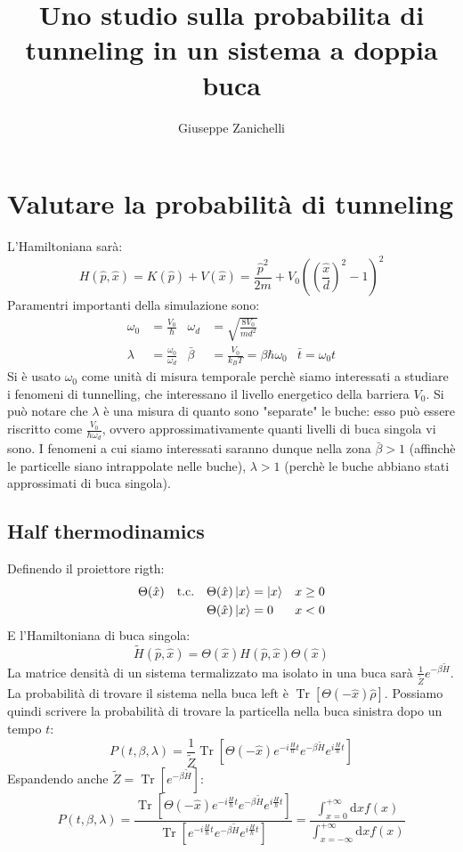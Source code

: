 \documentclass[italian]{article}
\title{Uno studio sulla probabilita di tunneling in un sistema a doppia buca}
\author{Giuseppe Zanichelli}
\newcommand{\op}{\hat{p}}
\newcommand{\ox}{\hat{x}}
\newcommand{\tc}{\quad\mathrm{t.c.}\quad}
\DeclareMathOperator{\Tr}{Tr}
\begin{document}
	\section{Valutare la probabilità di tunneling}
	L'Hamiltoniana sarà:
	\begin{equation}
		H(\op, \ox) = K(\op) + V(\ox) = \frac{\op^2}{2m} + V_0\left(\left(\frac{\ox}{d}\right)^2 - 1\right)^2
	\end{equation}
	Paramentri importanti della simulazione sono:
	\begin{align}
		\omega_0 & = \frac{V_0}{\hbar} & \omega_d & = \sqrt{\frac{8V_0}{md^2}} \\
		 \lambda &= \frac{\omega_0}{\omega_d} &
		\bar{\beta} &= \frac{V_0}{k_B T} =  \beta\hbar\omega_0&
		\bar{t} = \omega_0 t
	\end{align}
	Si è usato $\omega_0$ come unità di misura temporale perchè siamo interessati a studiare i fenomeni di tunnelling, che interessano il livello energetico della barriera $V_0$. Si può notare che $\lambda$ è una misura di quanto sono "separate" le buche: esso può essere riscritto come $\frac{V_0}{\hbar\omega_d}$, ovvero approssimativamente quanti livelli di buca singola vi sono. I fenomeni a cui siamo interessati saranno dunque nella zona $\bar{\beta} > 1$ (affinchè le particelle siano intrappolate nelle buche), $\lambda > 1$ (perchè le buche abbiano stati approssimati di buca singola).
	\subsection{Half thermodinamics}
	Definendo il proiettore rigth:
	\begin{align}
		\Theta(\ox) \tc &\Theta(\ox)\ket{x} = \ket{x} & x\ge0 \\
		&\Theta(\ox)\ket{x} = 0 & x<0
	\end{align}
	E l'Hamiltoniana di buca singola:
	\begin{equation}
		\tilde{H}(\op, \ox) = \Theta(\ox)H(\op, \ox)\Theta(\ox)
	\end{equation}
	La matrice densità di un sistema termalizzato ma isolato in una buca sarà $\frac{1}{\tilde{Z}}e^{-\beta\tilde{H}}$. La probabilità di trovare il sistema nella buca left è $\Tr\left[\Theta(-\ox)\hat{\rho}\right]$. Possiamo quindi scrivere la probabilità di trovare la particella nella buca sinistra dopo un tempo $t$:
	\begin{equation}
		P(t,\beta, \lambda) = \frac{1}{\tilde{Z}}\Tr\left[\Theta(-\ox)
		e^{-i\frac{H}{\hbar}t}
		e^{-\beta\tilde{H}}
		e^{i\frac{H}{\hbar}t}
		\right]
	\end{equation}
	Espandendo anche $\tilde{Z} = \Tr\left[e^{-\beta\tilde{H}}\right]$:
	\begin{equation}
		P(t,\beta, \lambda) = \frac{\Tr\left[\Theta(-\ox)
			e^{-i\frac{H}{\hbar}t}
			e^{-\beta\tilde{H}}
			e^{i\frac{H}{\hbar}t}
			\right]}{\Tr\left[
			e^{-i\frac{H}{\hbar}t}
			e^{-\beta\tilde{H}}
			e^{i\frac{H}{\hbar}t}
			\right]}=\frac{\int_{x=0}^{+\infty}{\mathrm{d}xf(x)}}
		{\int_{x=-\infty}^{+\infty}\mathrm{d}xf(x)}
	\end{equation}
\end{document}
